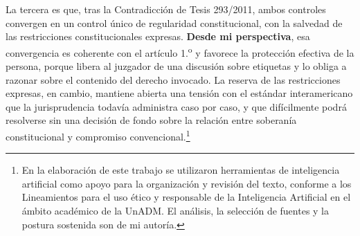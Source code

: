 \documentclass[
  spanish,
  letterpaper, oneside
]{article}
\begin{document}
La tercera es que, tras la Contradicción de Tesis 293/2011, ambos controles
convergen en un control único de regularidad constitucional, con la salvedad de las
restricciones constitucionales expresas. \textbf{Desde mi perspectiva}, esa
convergencia es coherente con el artículo 1.\textsuperscript{o} y favorece la
protección efectiva de la persona, porque libera al juzgador de una discusión sobre
etiquetas y lo obliga a razonar sobre el contenido del derecho invocado. La reserva
de las restricciones expresas, en cambio, mantiene abierta una tensión con el
estándar interamericano que la jurisprudencia todavía administra caso por caso, y
que difícilmente podrá resolverse sin una decisión de fondo sobre la relación entre
soberanía constitucional y compromiso convencional.\footnote{En la elaboración de
este trabajo se utilizaron herramientas de inteligencia artificial como apoyo para
la organización y revisión del texto, conforme a los Lineamientos para el uso ético
y responsable de la Inteligencia Artificial en el ámbito académico de la UnADM. El
análisis, la selección de fuentes y la postura sostenida son de mi autoría.}


\end{document}
